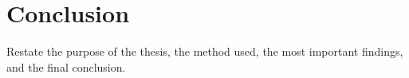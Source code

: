 \chapter{Conclusion}

Restate the purpose of the thesis, the method used, the most important findings, and the final conclusion.
